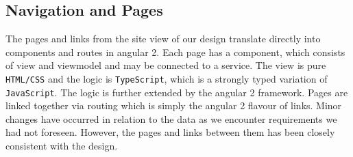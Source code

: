 \documentclass[10pt,a4paper]{report}
\begin{document}
\subsection{Navigation and Pages}
The pages and links from the site view of our design translate directly into components and routes in angular 2. Each page has a component, which consists of view and viewmodel and may be connected to a service. The view is pure \texttt{HTML/CSS} and the logic is \texttt{TypeScript}, which is a strongly typed variation of \texttt{JavaScript}. The logic is further extended by the angular 2 framework. Pages are linked together via routing which is simply the angular 2 flavour of links. Minor changes have occurred in relation to the data as we encounter requirements we had not foreseen. However, the pages and links between them has been closely consistent with the design. 
\end{document}

